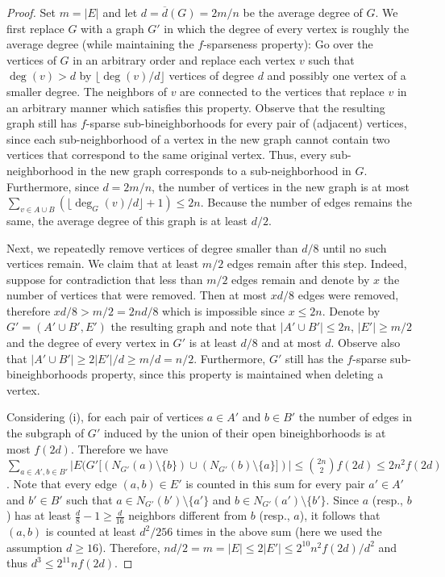 \documentclass[11pt]{article}
\theoremstyle{definition}
\begin{document}
\begin{proof}
	Set $m=|E|$ and let $d=\overline{d}(G)=2m/n$ be the average degree of $G$.
	We first replace $G$ with a graph $G'$ in which the degree of every vertex is roughly the average degree (while maintaining the $f$-sparseness property):
	Go over the vertices of $G$ in an arbitrary order and replace each vertex $v$ such that $\deg(v)>d$ by $\lfloor \deg(v)/d \rfloor$ vertices of degree $d$ and possibly one vertex of a smaller degree.
	The neighbors of $v$ are connected to the vertices that replace $v$ in an arbitrary manner which satisfies this property.
	Observe that the resulting graph still has $f$-sparse sub-bineighborhoods for every pair of (adjacent) vertices, since each sub-neighborhood of a vertex in the new graph cannot contain two vertices that correspond to the same original vertex.
	Thus, every sub-neighborhood in the new graph corresponds to a sub-neighborhood in $G$.
	Furthermore, since $d=2m/n$, the number of vertices in the new graph is at most $\sum_{v \in A\cup B} (\lfloor \deg_{G}(v)/d \rfloor + 1) \le 2n$. 
	Because the number of edges remains the same, the average degree of this graph is at least $d/2$.
	
	Next, we repeatedly remove vertices of degree smaller than $d/8$ until no such vertices remain.
	We claim that at least $m/2$ edges remain after this step.
	Indeed, suppose for contradiction that less than $m/2$ edges remain and denote by $x$ the number of vertices that were removed.
	Then at most $xd/8$ edges were removed, therefore $xd/8>m/2=2nd/8$ which is impossible since $x \le 2n$.	
	Denote by $G'=(A' \cup B', E')$ the resulting graph and note that $|A' \cup B'| \le 2n$, $|E'| \ge m/2$ and the degree of every vertex in $G'$ is at least $d/8$ and at most $d$.
	Observe also that  $|A' \cup B'| \ge 2|E'|/d \ge m/d = n/2$.
	Furthermore, $G'$ still has the $f$-sparse sub-bineighborhoods property, since this property is maintained when deleting a vertex.
	
	Considering (i), for each pair of vertices $a \in A'$ and $b \in B'$ the number of edges in the subgraph of $G'$ induced by the union of their open bineighborhoods is at most $f(2d)$.
	Therefore we have $\sum_{a \in A', b \in B'}  |E(G'[(N_{G'}(a)\setminus \{b\}) \cup (N_{G'}(b) \setminus \{a\}])| \le \binom{2n}{2} f(2d) \le 2n^2 f(2d)$.
	Note that every edge $(a,b) \in E'$ is counted in this sum for every pair $a' \in A'$ and $b' \in B'$ such that $a \in N_{G'}(b') \setminus \{a'\}$ and $b \in N_{G'}(a') \setminus \{b'\}$. Since $a$ (resp., $b$) has at least $\frac{d}{8}-1 \ge \frac{d}{16}$ neighbors different from $b$ (resp., $a$), it follows that $(a,b)$ is counted at least $d^2/256$ times in the above sum (here we used the assumption $d \ge 16$).
	Therefore, $nd/2=m=|E| \le 2|E'| \le 2^{10} n^2f(2d)/d^2$ and thus $d^3 \le 2^{11}nf(2d)$.
	

\end{proof}
\end{document}
